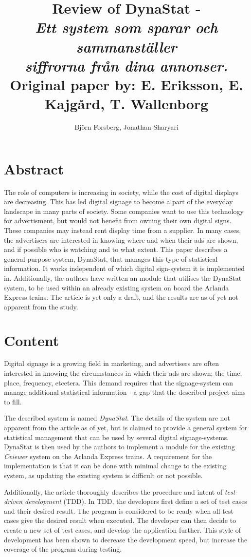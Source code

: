 \documentclass[a4paper,10pt]{article}
\title{Review of DynaStat - \\
	\emph{Ett system som sparar och sammanställer} \\
	\emph{siffrorna från dina annonser.}\\
	\vspace{3mm} \normalsize Original paper by: E. Eriksson, E. Kajgård, T. Wallenborg}
\author{Bj{\"o}rn Forsberg, Jonathan Sharyari}
\begin{document}
\maketitle


\section{Abstract}

The role of computers is increasing in society, while the cost of digital displays are decreasing. This has led digital signage to become a part of the everyday landscape in many parts of society. Some companies want to use this technology for advertisment, but would not benefit from owning their own digital signs. These companies may instead rent display time from a supplier. In many cases, the advertisers are interested in knowing where and when their ads are shown, and if possible who is watching and to what extent. This paper describes a general-purpose system, DynaStat, that manages this type of statistical information. It works independent of which digital sign-system it is implemented in. Additionally, the authors have written an module that utilises the DynaStat system, to be used within an already existing system on board the Arlanda Express trains. The article is yet only a draft, and the results are as of yet not apparent from the study.

\section{Content}
Digital signage is a growing field in marketing, and advertisers are often interested in knowing the circumstances in which their ads are shown; the time, place, frequency, etcetera. This demand requires that the signage-system can manage additional statistical information - a gap that the described project aims to fill.

The described system is named \emph{DynaStat}. The details of the system are not apparent from the article as of yet, but is claimed to provide a general system for statistical management that can be used by several digital signage-systems. DynaStat is then used by the authors to implement a module for the existing \emph{Cviewer} system on the Arlanda Express trains. A requirement for the implementation is that it can be done with minimal change to the existing system, as updating the existing system is difficult or not possible.

Additionally, the article thoroughly describes the procedure and intent of \emph{test-driven development} (TDD). In TDD, the developers first define a set of test cases and their desired result. The program is considered to be ready when all test cases give the desired result when executed. The developer can then decide to create a new set of test cases, and develop the application further. This style of development has been shown to decrease the development speed, but increase the coverage of the program during testing.
\end{document}
